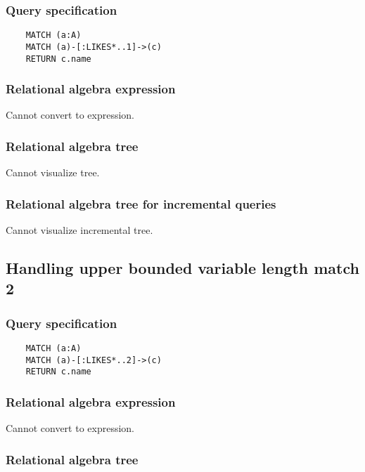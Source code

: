 	\subsubsection*{Query specification}

	\begin{lstlisting}
	MATCH (a:A)
	MATCH (a)-[:LIKES*..1]->(c)
	RETURN c.name
	\end{lstlisting}


	\subsubsection*{Relational algebra expression}

	Cannot convert to expression.

	\subsubsection*{Relational algebra tree}

	Cannot visualize tree.

	\subsubsection*{Relational algebra tree for incremental queries}

	Cannot visualize incremental tree.
	\subsection{Handling upper bounded variable length match 2}

	\subsubsection*{Query specification}

	\begin{lstlisting}
	MATCH (a:A)
	MATCH (a)-[:LIKES*..2]->(c)
	RETURN c.name
	\end{lstlisting}


	\subsubsection*{Relational algebra expression}

	Cannot convert to expression.

	\subsubsection*{Relational algebra tree}

